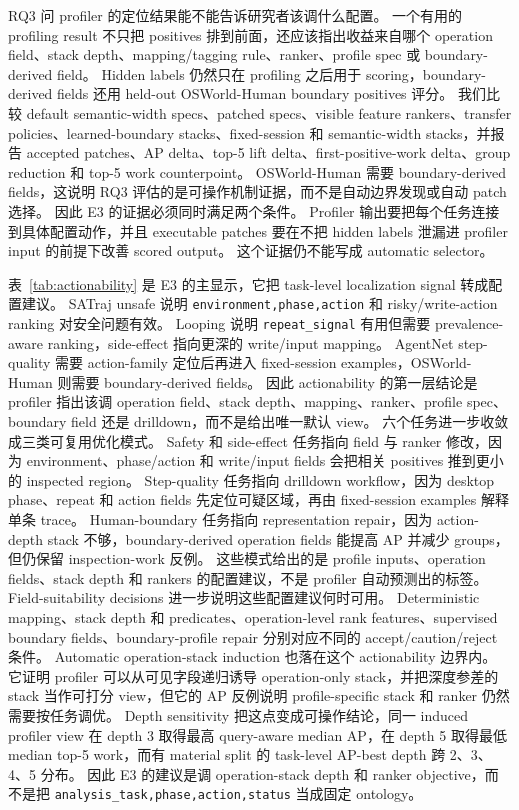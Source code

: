 \documentclass[10pt,twocolumn]{ctexart}
\begin{document}
RQ3 问 profiler 的定位结果能不能告诉研究者该调什么配置。
一个有用的 profiling result 不只把 positives 排到前面，还应该指出收益来自哪个 operation field、stack depth、mapping/tagging rule、ranker、profile spec 或 boundary-derived field。
Hidden labels 仍然只在 profiling 之后用于 scoring，boundary-derived fields 还用 held-out OSWorld-Human boundary positives 评分。
我们比较 default semantic-width specs、patched specs、visible feature rankers、transfer policies、learned-boundary stacks、fixed-session 和 semantic-width stacks，并报告 accepted patches、AP delta、top-5 lift delta、first-positive-work delta、group reduction 和 top-5 work counterpoint。
OSWorld-Human 需要 boundary-derived fields，这说明 RQ3 评估的是可操作机制证据，而不是自动边界发现或自动 patch 选择。
因此 E3 的证据必须同时满足两个条件。
Profiler 输出要把每个任务连接到具体配置动作，并且 executable patches 要在不把 hidden labels 泄漏进 profiler input 的前提下改善 scored output。
这个证据仍不能写成 automatic selector。

表~\ref{tab:actionability} 是 E3 的主显示，它把 task-level localization signal 转成配置建议。
SATraj unsafe 说明 \texttt{environment,phase,action} 和 risky/write-action ranking 对安全问题有效。
Looping 说明 \texttt{repeat\_signal} 有用但需要 prevalence-aware ranking，side-effect 指向更深的 write/input mapping。
AgentNet step-quality 需要 action-family 定位后再进入 fixed-session examples，OSWorld-Human 则需要 boundary-derived fields。
因此 actionability 的第一层结论是 profiler 指出该调 operation field、stack depth、mapping、ranker、profile spec、boundary field 还是 drilldown，而不是给出唯一默认 view。
六个任务进一步收敛成三类可复用优化模式。
Safety 和 side-effect 任务指向 field 与 ranker 修改，因为 environment、phase/action 和 write/input fields 会把相关 positives 推到更小的 inspected region。
Step-quality 任务指向 drilldown workflow，因为 desktop phase、repeat 和 action fields 先定位可疑区域，再由 fixed-session examples 解释单条 trace。
Human-boundary 任务指向 representation repair，因为 action-depth stack 不够，boundary-derived operation fields 能提高 AP 并减少 groups，但仍保留 inspection-work 反例。
这些模式给出的是 profile inputs、operation fields、stack depth 和 rankers 的配置建议，不是 profiler 自动预测出的标签。
Field-suitability decisions 进一步说明这些配置建议何时可用。
Deterministic mapping、stack depth 和 predicates、operation-level rank features、supervised boundary fields、boundary-profile repair 分别对应不同的 accept/caution/reject 条件。
Automatic operation-stack induction 也落在这个 actionability 边界内。
它证明 profiler 可以从可见字段递归诱导 operation-only stack，并把深度参差的 stack 当作可打分 view，但它的 AP 反例说明 profile-specific stack 和 ranker 仍然需要按任务调优。
Depth sensitivity 把这点变成可操作结论，同一 induced profiler view 在 depth 3 取得最高 query-aware median AP，在 depth 5 取得最低 median top-5 work，而有 material split 的 task-level AP-best depth 跨 2、3、4、5 分布。
因此 E3 的建议是调 operation-stack depth 和 ranker objective，而不是把 \texttt{analysis\_task,phase,action,status} 当成固定 ontology。
\end{document}
